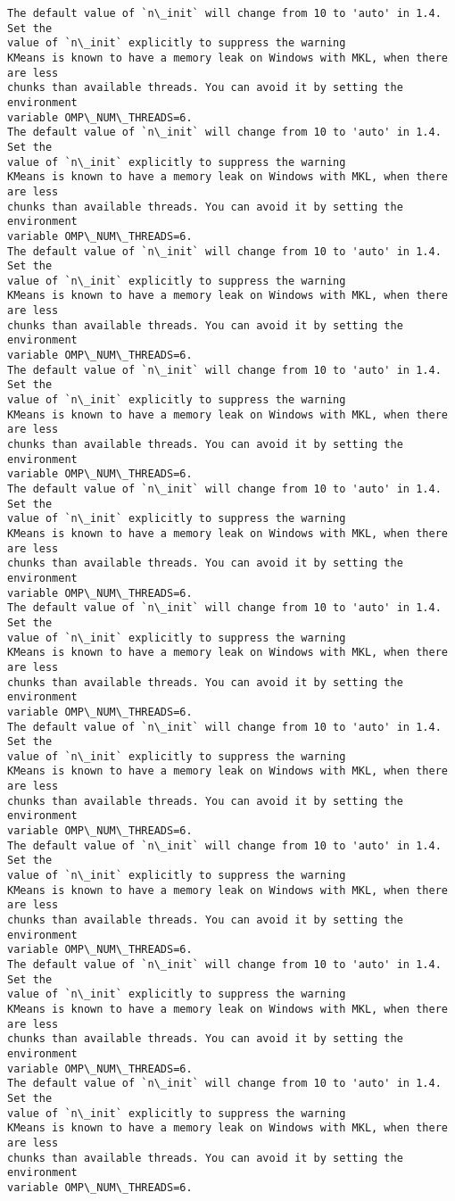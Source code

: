 \documentclass[11pt]{article}
\begin{document}
    \begin{Verbatim}[commandchars=\\\{\}]
The default value of `n\_init` will change from 10 to 'auto' in 1.4. Set the
value of `n\_init` explicitly to suppress the warning
KMeans is known to have a memory leak on Windows with MKL, when there are less
chunks than available threads. You can avoid it by setting the environment
variable OMP\_NUM\_THREADS=6.
The default value of `n\_init` will change from 10 to 'auto' in 1.4. Set the
value of `n\_init` explicitly to suppress the warning
KMeans is known to have a memory leak on Windows with MKL, when there are less
chunks than available threads. You can avoid it by setting the environment
variable OMP\_NUM\_THREADS=6.
The default value of `n\_init` will change from 10 to 'auto' in 1.4. Set the
value of `n\_init` explicitly to suppress the warning
KMeans is known to have a memory leak on Windows with MKL, when there are less
chunks than available threads. You can avoid it by setting the environment
variable OMP\_NUM\_THREADS=6.
The default value of `n\_init` will change from 10 to 'auto' in 1.4. Set the
value of `n\_init` explicitly to suppress the warning
KMeans is known to have a memory leak on Windows with MKL, when there are less
chunks than available threads. You can avoid it by setting the environment
variable OMP\_NUM\_THREADS=6.
The default value of `n\_init` will change from 10 to 'auto' in 1.4. Set the
value of `n\_init` explicitly to suppress the warning
KMeans is known to have a memory leak on Windows with MKL, when there are less
chunks than available threads. You can avoid it by setting the environment
variable OMP\_NUM\_THREADS=6.
The default value of `n\_init` will change from 10 to 'auto' in 1.4. Set the
value of `n\_init` explicitly to suppress the warning
KMeans is known to have a memory leak on Windows with MKL, when there are less
chunks than available threads. You can avoid it by setting the environment
variable OMP\_NUM\_THREADS=6.
The default value of `n\_init` will change from 10 to 'auto' in 1.4. Set the
value of `n\_init` explicitly to suppress the warning
KMeans is known to have a memory leak on Windows with MKL, when there are less
chunks than available threads. You can avoid it by setting the environment
variable OMP\_NUM\_THREADS=6.
The default value of `n\_init` will change from 10 to 'auto' in 1.4. Set the
value of `n\_init` explicitly to suppress the warning
KMeans is known to have a memory leak on Windows with MKL, when there are less
chunks than available threads. You can avoid it by setting the environment
variable OMP\_NUM\_THREADS=6.
The default value of `n\_init` will change from 10 to 'auto' in 1.4. Set the
value of `n\_init` explicitly to suppress the warning
KMeans is known to have a memory leak on Windows with MKL, when there are less
chunks than available threads. You can avoid it by setting the environment
variable OMP\_NUM\_THREADS=6.
The default value of `n\_init` will change from 10 to 'auto' in 1.4. Set the
value of `n\_init` explicitly to suppress the warning
KMeans is known to have a memory leak on Windows with MKL, when there are less
chunks than available threads. You can avoid it by setting the environment
variable OMP\_NUM\_THREADS=6.
    \end{Verbatim}
\end{document}
